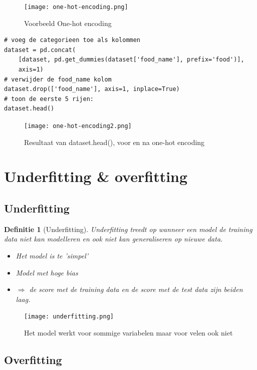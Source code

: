 \documentclass{article}
\newtheorem{theorem}{Definitie}[section]
\begin{document}
\begin{figure}[H]
    \centering
    \texttt{[image: one-hot-encoding.png]}
    \caption{Voorbeeld One-hot encoding}
\end{figure}

\begin{verbatim}
# voeg de categorieen toe als kolommen
dataset = pd.concat(
    [dataset, pd.get_dummies(dataset['food_name'], prefix='food')], 
    axis=1)
# verwijder de food_name kolom
dataset.drop(['food_name'], axis=1, inplace=True)
# toon de eerste 5 rijen:
dataset.head()
\end{verbatim}

\begin{figure}[H]
    \centering
    \texttt{[image: one-hot-encoding2.png]}
    \caption{Resultaat van dataset.head(), voor en na one-hot encoding}
\end{figure}

\section{Underfitting \& overfitting}

\subsection{Underfitting}

\begin{theorem}[Underfitting]
Underfitting treedt op wanneer een model de training data niet kan modelleren 
en ook niet kan generaliseren op nieuwe data.

\begin{itemize}
    \item Het model is te 'simpel'
    \item Model met hoge bias
    \item $\Rightarrow$ de score met de training data en de score met de test data zijn beiden laag.
\end{itemize}
\end{theorem}

\begin{figure}[H]
    \centering
    \texttt{[image: underfitting.png]}
    \caption{Het model werkt voor sommige variabelen maar voor velen ook niet}
\end{figure}

\subsection{Overfitting}
\end{document}
